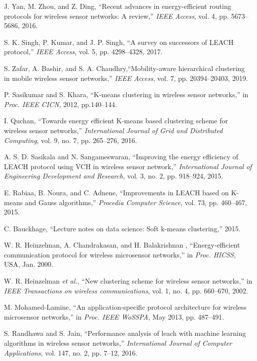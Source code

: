 \documentclass[journal,twoside,web]{ieeecolor}
\begin{document}
\begin{thebibliography}{00}
 J. Yan, M. Zhou, and Z. Ding, ``Recent advances in energy-efficient routing protocols for wireless sensor networks: A review,'' \emph{IEEE Access}, vol. 4, pp. 5673--5686, 2016.

 S. K. Singh, P. Kumar, and J. P. Singh, ``A survey on successors of LEACH protocol,'' \emph{IEEE Access}, vol. 5, pp. 4298--4328, 2017.

 S. Zafar, A. Bashir, and  S. A. Chaudhry,``Mobility-aware hierarchical clustering in mobile wireless sensor networks,'' \emph{IEEE Access}, vol. 7, pp. 20394--20403, 2019.

 P. Sasikumar and S. Khara, ``K-means clustering in wireless sensor networks,'' in \emph{Proc. IEEE CICN}, 2012, pp.140--144.

 I. Quchan, ``Towards energy efficient K-means based clustering scheme for wireless sensor networks,'' \emph{International Journal of Grid and Distributed Computing}, vol. 9, no. 7, pp. 265--276, 2016.

 A. S. D. Sasikala and N. Sangameswaran, ``Improving the energy efficiency of LEACH protocol using VCH in wireless sensor network,'' \emph{International Journal of Engineering Development and Research}, vol. 3, no. 2, pp. 918--924, 2015.

  E. Rabiaa, B. Noura, and C. Adnene, ``Improvements in LEACH based on K-means and Gauss algorithms,'' \emph{Procedia Computer Science}, vol. 73, pp. 460--467, 2015.

  C. Bauckhage, ``Lecture notes on data science: Soft k-means clustering,'' 2015.

 W. R. Heinzelman, A. Chandrakasan, and H. Balakrishnan , ``Energy-efficient communication protocol for wireless microsensor networks,'' in \emph{Proc. HICSS}, USA, Jan. 2000.


 W. R. Heinzelman \emph{et al.}, ``New clustering scheme for wireless sensor networks,'' in \emph{IEEE Transactions on wireless communications}, vol. 1, no. 4, pp. 660--670, 2002.

 M. Mohamed-Lamine, ``An application-specific protocol architecture for wireless microsensor networks,'' in \emph{Proc. IEEE WoSSPA}, May 2013, pp. 487--491.

 S. Randhawa and S. Jain, ``Performance analysis of leach with machine learning algorithms in wireless sensor networks,'' \emph{International Journal of Computer Applications}, vol. 147, no. 2, pp.
7--12, 2016.


\end{thebibliography}
\end{document}
